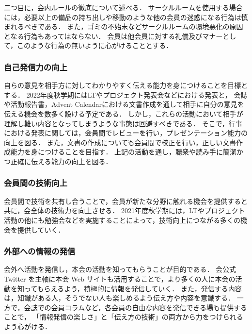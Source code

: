 二つ目に，会内ルールの徹底について述べる．
サークルルームを使用する場合には，必要以上の備品の持ち出しや移動のような他の会員の迷惑になる行為は慎まれるべきである．
また，ゴミの不始末などサークルルームの環境悪化の原因となる行為もあってはならない．
会員は他会員に対する礼儀及びマナーとして，このような行為の無いように心がけることとする．

\subsubsection*{自己発信力の向上}
自らの意見を相手方に対してわかりやすく伝える能力を身につけることを目標とする．
2022年度秋学期にはLTやプロジェクト発表会などにおける発表と，
会誌や活動報告書，Advent Calendarにおける文書作成を通して相手に自分の意見を伝える機会を数多く設ける予定である．
しかし，これらの活動において相手が理解し難い内容となってしまうような事態は回避すべきである．
そこで，行事における発表に関しては，会員間でレビューを行い，プレゼンテーション能力の向上を図る．
また，文書の作成についても会員間で校正を行い，正しい文書作成能力を身につけることを目指す．
上記の活動を通し，聴衆や読み手に簡潔かつ正確に伝える能力の向上を図る．

\subsubsection*{会員間の技術向上}
会員間で技術を共有し合うことで，会員が新たな分野に触れる機会を提供すると共に，会全体の技術力を向上させる．
2021年度秋学期には，LTやプロジェクト活動の他にも勉強会などを実施することによって，技術向上につながる多くの機会を提供していく．

\subsubsection*{外部への情報の発信}
会外へ活動を発信し，本会の活動を知ってもらうことが目的である．
会公式 Twitter を主軸に本会 Web サイトも活用することで，より多くの人に本会の活動を知ってもらえるよう，積極的に情報を発信していく．
また，発信する内容は，知識がある人，そうでない人も楽しめるよう伝え方や内容を意識する．
一方で，会誌での会員コラムなど，各会員の自由な内容を発信できる場も提供することで，
「情報発信の楽しさ」と「伝え方の技術」の両方から力をつけられるよう心がける．
